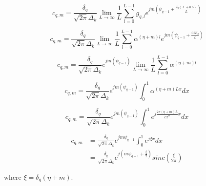 \begin{equation}
    c_{q,m} = \frac{\delta_q}{\sqrt{2\pi}\Delta_k}\lim_{L\rightarrow \infty} \frac{1}{L}\sum_{l=0}^{L-1} g_{q, l} e^{jm(\psi_{q-1}+\frac{\delta_q(\ell+0.5)}{L})}
\end{equation}

\begin{equation}
    c_{q,m} = \frac{\delta_q}{\sqrt{2\pi}\Delta_k}\lim_{L\rightarrow \infty} \frac{1}{L}\sum_{l=0}^{L-1} \alpha^{(\eta+m) l} e^{jm(\psi_{q-1}+\frac{0.5\delta_q}{L})} 
\end{equation}


\begin{equation}
    c_{q,m} = \frac{\delta_q}{\sqrt{2\pi}\Delta_k}e^{jm(\psi_{q-1})}\lim_{L\longrightarrow \infty} \frac{1}{L}\sum_{l=0}^{L-1} \alpha^{(\eta+m) l}   
\end{equation}

\begin{equation}
    c_{q,m} = \frac{\delta_q}{\sqrt{2\pi}\Delta_k}e^{jm(\psi_{q-1})} \int_{0}^{1} \alpha^{(\eta + m)Lx}dx
\end{equation}


\begin{equation}
    c_{q,m} = \frac{\delta_q}{\sqrt{2\pi}\Delta_k}e^{jm(\psi_{q-1})} \int_{0}^{1} e^{j\frac{2\pi(\eta + m)L}{L2^B}x}dx
\end{equation}


\begin{align}
 c_{q,m} &= \frac{\delta_q}{\sqrt{2\pi}\Delta_k}e^{jm\psi_{q-1}} \int_{0}^{1} e^{j\xi x}dx \nonumber \\
 &= \frac{\delta_q}{\sqrt{2\pi}\Delta_k}e^{j(m\psi_{q-1} + \frac{\xi}{2})} sinc(\frac{\xi}{2\pi}) \label{final_g}
\end{align}

where $\xi = \delta_q (\eta +m )$.










